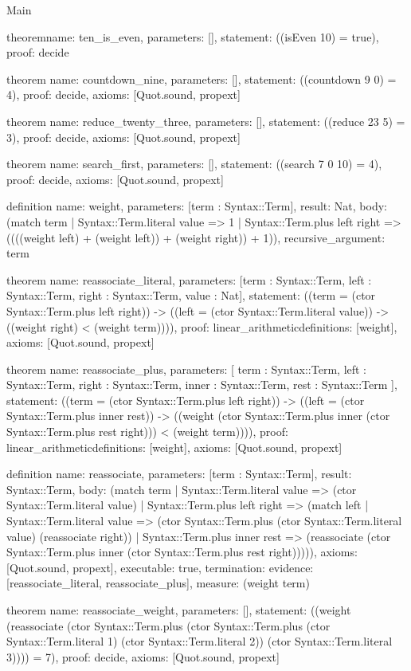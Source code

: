 \begin{lexlean}{Main}
\begin{semanticmodule}
theorem{name: ten_is_even, parameters: [], statement: ((isEven 10) = true), proof: decide{}}

theorem{
  name: countdown_nine,
  parameters: [],
  statement: ((countdown 9 0) = 4),
  proof: decide{},
  axioms: [Quot.sound, propext]
}

theorem{
  name: reduce_twenty_three,
  parameters: [],
  statement: ((reduce 23 5) = 3),
  proof: decide{},
  axioms: [Quot.sound, propext]
}

theorem{
  name: search_first,
  parameters: [],
  statement: ((search 7 0 10) = 4),
  proof: decide{},
  axioms: [Quot.sound, propext]
}

definition{
  name: weight,
  parameters: [term : Syntax::Term],
  result: Nat,
  body: (match term
    | Syntax::Term.literal value => 1
    | Syntax::Term.plus left right => ((((weight left) + (weight left)) + (weight right)) + 1)),
  recursive_argument: term
}

theorem{
  name: reassociate_literal,
  parameters: [term : Syntax::Term, left : Syntax::Term, right : Syntax::Term, value : Nat],
  statement: ((term = (ctor Syntax::Term.plus left right)) -> ((left = (ctor Syntax::Term.literal value)) -> ((weight right) < (weight term)))),
  proof: linear_arithmetic{definitions: [weight]},
  axioms: [Quot.sound, propext]
}

theorem{
  name: reassociate_plus,
  parameters: [
    term : Syntax::Term,
    left : Syntax::Term,
    right : Syntax::Term,
    inner : Syntax::Term,
    rest : Syntax::Term
  ],
  statement: ((term = (ctor Syntax::Term.plus left right)) -> ((left = (ctor Syntax::Term.plus inner rest)) -> ((weight (ctor Syntax::Term.plus inner (ctor Syntax::Term.plus rest right))) < (weight term)))),
  proof: linear_arithmetic{definitions: [weight]},
  axioms: [Quot.sound, propext]
}

definition{
  name: reassociate,
  parameters: [term : Syntax::Term],
  result: Syntax::Term,
  body: (match term
    | Syntax::Term.literal value => (ctor Syntax::Term.literal value)
    | Syntax::Term.plus left right => (match left
      | Syntax::Term.literal value => (ctor Syntax::Term.plus (ctor Syntax::Term.literal value) (reassociate right))
      | Syntax::Term.plus inner rest => (reassociate (ctor Syntax::Term.plus inner (ctor Syntax::Term.plus rest right))))),
  axioms: [Quot.sound, propext],
  executable: true,
  termination: {evidence: [reassociate_literal, reassociate_plus], measure: (weight term)}
}

theorem{
  name: reassociate_weight,
  parameters: [],
  statement: ((weight (reassociate (ctor Syntax::Term.plus (ctor Syntax::Term.plus (ctor Syntax::Term.literal 1) (ctor Syntax::Term.literal 2)) (ctor Syntax::Term.literal 3)))) = 7),
  proof: decide{},
  axioms: [Quot.sound, propext]
}


\end{semanticmodule}
\end{lexlean}
